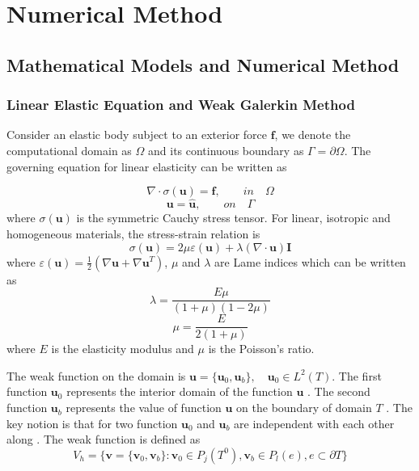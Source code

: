 \chapter{Numerical Method}
\label{chapter2}

\section{Mathematical Models and Numerical Method}
\label{sec:equations}

\subsection{Linear Elastic Equation and Weak Galerkin Method}
Consider an elastic body subject to an exterior force $ \mathbf{f} $, we denote the computational domain as $ \Omega $ and its continuous boundary as $ \Gamma = \partial \Omega $. The governing equation for linear elasticity can be written as

\begin{equation}
\nabla \cdot \sigma(\mathbf{u}) = \mathbf{f}, \qquad in \quad \Omega 
\end{equation}
\begin{equation}
\mathbf{u} = \hat{\mathbf{u}}, \qquad on \quad \Gamma
\end{equation}
where $ \sigma(\mathbf{u}) $ is the symmetric Cauchy stress tensor. For linear, isotropic and homogeneous materials, the stress-strain relation is
\begin{equation}
\sigma(\mathbf{u}) = 2 \mu \varepsilon(\mathbf{u}) + \lambda (\nabla \cdot \mathbf{u}) \mathbf{I}
\end{equation}
where $ \varepsilon(\mathbf{u}) = \frac{1}{2} (\nabla \mathbf{u} + \nabla \mathbf{u}^{T}) $, $ \mu $ and $ \lambda  $ are Lame indices which can be written as 
\begin{equation}
\lambda = \frac{E\mu }{(1 + \mu) (1 - 2\mu)}
\end{equation}
\begin{equation}
\mu = \frac{E}{2(1+\mu)}
\end{equation}
where $ E $ is the elasticity modulus and $ \mu $ is the Poisson's ratio.



The weak function on the domain is $ \mathbf{u} = \{\mathbf{u}_0, \mathbf{u}_b \}, \quad \mathbf{u}_0 \in L^{2} (T) $. The first function $ \mathbf{u}_0 $  represents the interior domain of the function $ \mathbf{u} $ . The second function $ \mathbf{u}_b $ represents the value of function $ \mathbf{u} $ on the boundary of domain $ T $ . The key notion is that for two function $ \mathbf{u}_0 $  and $ \mathbf{u}_b $  are independent with each other along . The weak function is defined as
\begin{equation}
V_{h} = \{ \mathbf{v} = \{ \mathbf{v}_0, \mathbf{v}_b \} : \mathbf{v}_0 \in P_{j} (T^0), \mathbf{v}_b \in P_{l}(e), e \subset \partial T\}
\end{equation}

